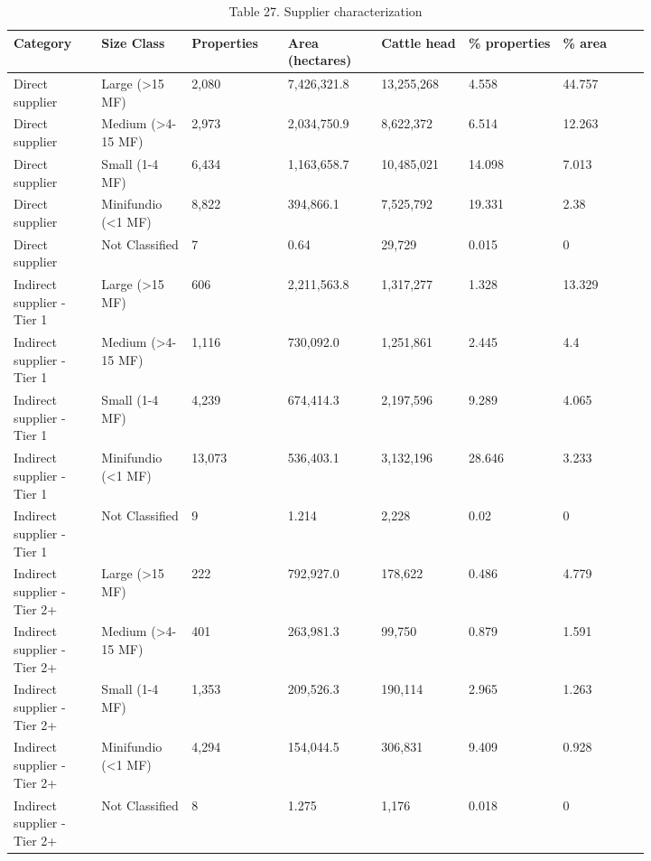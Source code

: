 \documentclass[12pt]{article}
\begin{document}
\begin{table}[H]
\centering
\caption{Table 27. Supplier characterization}
{\fontsize{12}{14}\selectfont
\setlength{\tabcolsep}{3pt}
\renewcommand{\arraystretch}{1.08}
\begin{tabular}{p{0.117\linewidth}p{0.117\linewidth}p{0.117\linewidth}p{0.117\linewidth}p{0.117\linewidth}p{0.117\linewidth}p{0.117\linewidth}}
\toprule
Category & Size Class & Properties & Area (hectares) & Cattle head & \% properties & \% area \\
\midrule
Direct supplier & Large (>15 MF) & 2,080 & 7,426,321.8 & 13,255,268 & 4.558 & 44.757 \\
Direct supplier & Medium (>4-15 MF) & 2,973 & 2,034,750.9 & 8,622,372 & 6.514 & 12.263 \\
Direct supplier & Small (1-4 MF) & 6,434 & 1,163,658.7 & 10,485,021 & 14.098 & 7.013 \\
Direct supplier & Minifundio (<1 MF) & 8,822 & 394,866.1 & 7,525,792 & 19.331 & 2.38 \\
Direct supplier & Not Classified & 7 & 0.64 & 29,729 & 0.015 & 0 \\
Indirect supplier - Tier 1 & Large (>15 MF) & 606 & 2,211,563.8 & 1,317,277 & 1.328 & 13.329 \\
Indirect supplier - Tier 1 & Medium (>4-15 MF) & 1,116 & 730,092.0 & 1,251,861 & 2.445 & 4.4 \\
Indirect supplier - Tier 1 & Small (1-4 MF) & 4,239 & 674,414.3 & 2,197,596 & 9.289 & 4.065 \\
Indirect supplier - Tier 1 & Minifundio (<1 MF) & 13,073 & 536,403.1 & 3,132,196 & 28.646 & 3.233 \\
Indirect supplier - Tier 1 & Not Classified & 9 & 1.214 & 2,228 & 0.02 & 0 \\
Indirect supplier - Tier 2+ & Large (>15 MF) & 222 & 792,927.0 & 178,622 & 0.486 & 4.779 \\
Indirect supplier - Tier 2+ & Medium (>4-15 MF) & 401 & 263,981.3 & 99,750 & 0.879 & 1.591 \\
Indirect supplier - Tier 2+ & Small (1-4 MF) & 1,353 & 209,526.3 & 190,114 & 2.965 & 1.263 \\
Indirect supplier - Tier 2+ & Minifundio (<1 MF) & 4,294 & 154,044.5 & 306,831 & 9.409 & 0.928 \\
Indirect supplier - Tier 2+ & Not Classified & 8 & 1.275 & 1,176 & 0.018 & 0 \\
\bottomrule
\end{tabular}
}
\end{table}
\end{document}
